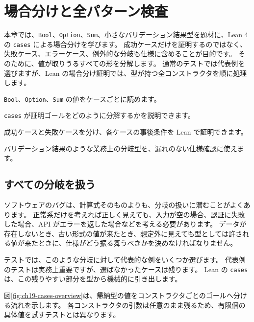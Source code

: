 \chapter{場合分けと全パターン検査}
\label{chap:cases-patterns}

\begin{chapterabstract}
本章では、\texttt{Bool}、\texttt{Option}、\texttt{Sum}、小さなバリデーション結果型を題材に、Lean 4 の \texttt{cases} による場合分けを学びます。
成功ケースだけを証明するのではなく、失敗ケース、エラーケース、例外的な分岐も仕様に含めることが目的です。
そのために、値が取りうるすべての形を分解します。
通常のテストでは代表例を選びますが、Lean の場合分け証明では、型が持つ全コンストラクタを順に処理します。
\end{chapterabstract}

\begin{learninggoals}
\item \texttt{Bool}、\texttt{Option}、\texttt{Sum} の値をケースごとに読めます。
\item \texttt{cases} が証明ゴールをどのように分解するかを説明できます。
\item 成功ケースと失敗ケースを分け、各ケースの事後条件を Lean で証明できます。
\item バリデーション結果のような業務上の分岐型を、漏れのない仕様確認に使えます。
\end{learninggoals}

\section{すべての分岐を扱う}

ソフトウェアのバグは、計算式そのものよりも、分岐の扱いに潜むことがよくあります。
正常系だけを考えれば正しく見えても、入力が空の場合、認証に失敗した場合、API がエラーを返した場合などを考える必要があります。
データが存在しないとき、古い形式の値が来たとき、想定外に見えても型としては許される値が来たときに、仕様がどう振る舞うべきかを決めなければなりません。

テストでは、このような分岐に対して代表的な例をいくつか選びます。
代表例のテストは実務上重要ですが、選ばなかったケースは残ります。
Lean の \texttt{cases} は、この残りやすい部分を型から機械的に引き出します。

図\ref{fig:ch19-cases-overview}は、帰納型の値をコンストラクタごとのゴールへ分ける流れを示します。
各コンストラクタの引数は任意のまま残るため、有限個の具体値を試すテストとは異なります。

